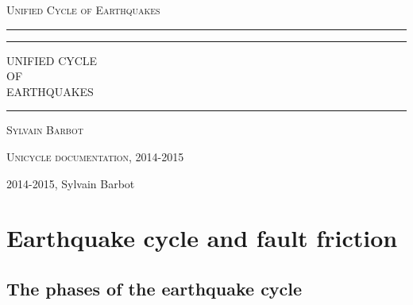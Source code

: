 \documentclass[letterpaper,12pt,]{memoir}
\newcommand*{\titleAT}{\begingroup
\newlength{\drop}
\setlength{\drop}{0.1\textheight}
\rule{\textwidth}{1pt}\par
\vspace{2pt}\vspace{-\baselineskip}
\rule{\textwidth}{0.4pt}\par
\vspace{0.5\drop}
\centering
{\Huge UNIFIED CYCLE}\\[0.9\baselineskip]
{\Large OF}\\[1.4\baselineskip]
{\Huge EARTHQUAKES}
\par
\vspace{0.25\drop}
\rule{0.3\textwidth}{0.4pt}\par
\vspace{\drop}
{\Large \scshape Sylvain Barbot}\par
\vfill
{\large\scshape Unicycle documentation, 2014-2015}\par
\vspace*{\drop}
\endgroup}
\begin{document}


\frontmatter


\pagestyle{empty}
\begin{center}
\Large\scshape Unified Cycle of Earthquakes
\end{center}

\clearpage


\begin{center}
\end{center}

\clearpage


\titleAT

\clearpage

\begingroup
\begin{center}
\footnotesize
\setlength{\parindent}{0pt}
\setlength{\parskip}{\baselineskip}
\textcopyright{} 2014-2015, Sylvain Barbot \\
\end{center}
\endgroup

\clearpage

\pagestyle{headings} %


\tableofcontents

\clearpage

\mainmatter


\chapter{Earthquake cycle and fault friction}

\clearpage

\section{The phases of the earthquake cycle}
\end{document}
